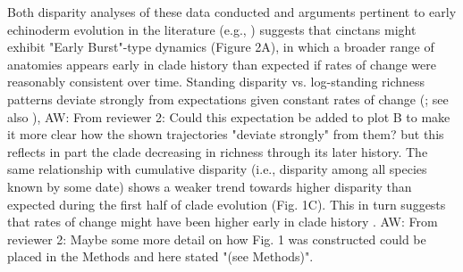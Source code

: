 \documentclass{article}
\newcommand{\amw}[1]{{\textcolor{OliveGreen}{AW: #1}}} %
\begin{document}
Both disparity analyses of these data conducted and arguments pertinent to early echinoderm evolution in the literature (e.g., \citealp{SmithEtAl2013}) suggests that cinctans might exhibit "Early Burst"-type dynamics (Figure 2A), in which a broader range of anatomies appears early in clade history than expected if rates of change were reasonably consistent over time.  Standing disparity vs. log-standing richness patterns deviate strongly from expectations given constant rates of change (\citealp{Jablonski2020}; see also \citealp{Wright2017}), \amw{From reviewer 2: Could this expectation be added to plot B to make it more clear how the shown trajectories "deviate strongly" from them?} but this reflects in part the clade decreasing in richness through its later history.  The same relationship with cumulative disparity (i.e., disparity among all species known by some date) shows a weaker trend towards higher disparity than expected during the first half of clade evolution (Fig. 1C).  This in turn suggests that rates of change might have been higher early in clade history \citep{Foote1996b}. 
\amw{From reviewer 2: Maybe some more detail on how Fig. 1 was constructed could be placed in the Methods and here stated "(see Methods)".}
\end{document}
